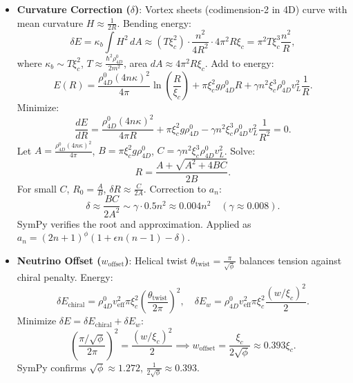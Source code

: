 \begin{itemize}
\item \textbf{Curvature Correction (\(\delta\))}: Vortex sheets (codimension-2 in 4D) curve with mean curvature \(H \approx \frac{1}{2R}\). Bending energy:
  \[
  \delta E = \kappa_b \int H^2 \, dA \approx \left(T \xi_c^2\right) \cdot \frac{n^2}{4 R^2} \cdot 4\pi^2 R \xi_c = \pi^2 T \xi_c^3 \frac{n^2}{R},
  \]
  where \(\kappa_b \sim T \xi_c^2\), \(T \approx \frac{\hbar^2 \rho_{4D}^0}{2 m^2}\), area \(dA \approx 4\pi^2 R \xi_c\). Add to energy:
  \[
  E(R) = \frac{\rho_{4D}^0 (4 n \kappa)^2}{4\pi} \ln\left(\frac{R}{\xi_c}\right) + \pi \xi_c^2 g \rho_{4D}^0 R + \gamma n^2 \xi_c^3 \rho_{4D}^0 v_L^2 \frac{1}{R}.
  \]
  Minimize:
  \[
  \frac{dE}{dR} = \frac{\rho_{4D}^0 (4 n \kappa)^2}{4\pi R} + \pi \xi_c^2 g \rho_{4D}^0 - \gamma n^2 \xi_c^3 \rho_{4D}^0 v_L^2 \frac{1}{R^2} = 0.
  \]
  Let \(A = \frac{\rho_{4D}^0 (4 n \kappa)^2}{4\pi}\), \(B = \pi \xi_c^2 g \rho_{4D}^0\), \(C = \gamma n^2 \xi_c^3 \rho_{4D}^0 v_L^2\). Solve:
  \[
  R = \frac{A + \sqrt{A^2 + 4 B C}}{2 B}.
  \]
  For small \(C\), \(R_0 = \frac{A}{B}\), \(\delta R \approx \frac{C}{2 A}\). Correction to \(a_n\):
  \[
  \delta \approx \frac{B C}{2 A^2} \sim \gamma \cdot 0.5 n^2 \approx 0.004 n^2 \quad (\gamma \approx 0.008).
  \]
  SymPy verifies the root and approximation. Applied as \(a_n = (2n+1)^\phi (1 + \epsilon n(n-1) - \delta)\).

\item \textbf{Neutrino Offset (\(w_{\text{offset}}\))}: Helical twist \(\theta_{\text{twist}} = \frac{\pi}{\sqrt{\phi}}\) balances tension against chiral penalty. Energy:
  \[
  \delta E_{\text{chiral}} = \rho_{4D}^0 v_{\text{eff}}^2 \pi \xi_c^2 \left( \frac{\theta_{\text{twist}}}{2\pi} \right)^2, \quad \delta E_w = \rho_{4D}^0 v_{\text{eff}}^2 \pi \xi_c^2 \frac{(w / \xi_c)^2}{2}.
  \]
  Minimize \(\delta E = \delta E_{\text{chiral}} + \delta E_w\):
  \[
  \left( \frac{\pi / \sqrt{\phi}}{2\pi} \right)^2 = \frac{(w / \xi_c)^2}{2} \implies w_{\text{offset}} = \frac{\xi_c}{2 \sqrt{\phi}} \approx 0.393 \xi_c.
  \]
  SymPy confirms \(\sqrt{\phi} \approx 1.272\), \(\frac{1}{2 \sqrt{\phi}} \approx 0.393\).
\end{itemize}


